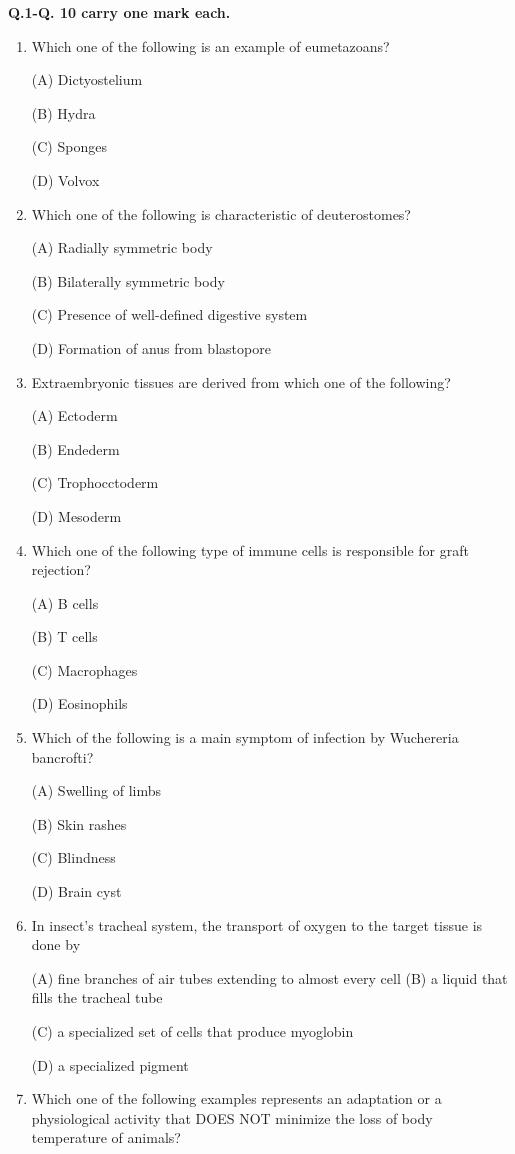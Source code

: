 \documentclass[journal]{IEEEtran}
\begin{document}
\textbf{Q.1-Q. 10 carry one mark each.}

\begin{enumerate}
	\item{ Which one of the following is an example of eumetazoans?

(A) Dictyostelium

(B) Hydra

(C) Sponges

(D) Volvox
		}
	\item {Which one of the following is characteristic of deuterostomes?

(A) Radially symmetric body

(B) Bilaterally symmetric body

(C) Presence of well-defined digestive system

(D) Formation of anus from blastopore
		}
	\item{ Extraembryonic tissues are derived from which one of the following?

(A) Ectoderm

(B) Endederm

(C) Trophocctoderm

(D) Mesoderm
		}
	\item{ Which one of the following type of immune cells is responsible for graft rejection?

(A) B cells

(B) T cells

(C) Macrophages

(D) Eosinophils
		}
	\item{ Which of the following is a main symptom of infection by Wuchereria bancrofti?

(A) Swelling of limbs

(B) Skin rashes

(C) Blindness

(D) Brain cyst
		}
	\item{ In insect's tracheal system, the transport of oxygen to the target tissue is done by

(A) fine branches of air tubes extending to almost every cell (B) a liquid that fills the tracheal tube

(C) a specialized set of cells that produce myoglobin

		(D) a specialized pigment}
\item {Which one of the following examples represents an adaptation or a physiological activity that DOES NOT minimize the loss of body temperature of animals?

}
\end{enumerate}
\end{document}
